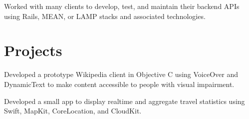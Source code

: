 \documentclass[]{jhearn-resume}
\begin{document}
\begin{minipage}[t]{0.64\textwidth}
\begin{tightemize}
\item Worked with many clients to develop, test, and maintain their backend APIs using Rails, MEAN, or LAMP stacks and associated technologies.
\end{tightemize}
\sectionsep



\section{Projects}
\begin{tightemize}
\item Developed a prototype Wikipedia client in Objective C using VoiceOver and DynamicText to make content accessible to people with visual impairment.
\end{tightemize}
\sectionsep

\begin{tightemize}
\item Developed a small app to display realtime and aggregate travel statistics using Swift, MapKit, CoreLocation, and CloudKit.
\end{tightemize}
\sectionsep


\end{minipage} 
\hfill
\end{document}
